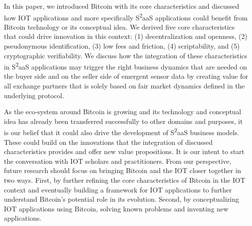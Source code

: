 In this paper, we introduced Bitcoin with its core characteristics and discussed how IOT applications and more specifically S\textsuperscript{2}aaS applications could benefit from Bitcoin technology or its conceptual idea. We derived five core characteristics that could drive innovation in this context: (1) decentralization and openness, (2) pseudonymous identification, (3) low fees and friction, (4) scriptability, and (5) cryptographic verifiability. We discuss how the integration of these characteristics in S\textsuperscript{2}aaS applications may trigger the right business dynamics that are needed on the buyer side and on the seller side of emergent sensor data by creating value for all exchange partners that is solely based on fair market dynamics defined in the underlying protocol. 

As the eco-system around Bitcoin is growing and its technology and conceptual idea has already been transferred successfully to other domains and purposes, it is our belief that it could also drive the development of S\textsuperscript{2}aaS business models. These could build on the innovations that the integration of discussed characteristics provides and offer new value propositions. It is our intent to start the conversation with IOT scholars and practitioners. From our perspective, future research should focus on bringing Bitcoin and the IOT closer together in two ways. First, by further refining the core characteristics of Bitcoin in the IOT context and eventually building a framework for IOT applications to further understand Bitcoin's potential role in its evolution. Second, by conceptualizing IOT applications using Bitcoin, solving known problems and inventing new applications.

